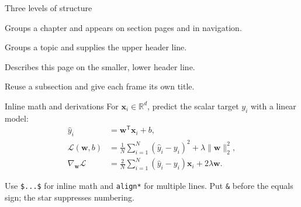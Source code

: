 


\begin{frame}{Three levels of structure}
  \begin{description}[Subsection]
    \item[Section] Groups a chapter and appears on section pages and in navigation.
    \item[Subsection] Groups a topic and supplies the upper header line.
    \item[Frametitle] Describes this page on the smaller, lower header line.
    \item[More pages] Reuse a subsection and give each frame its own title.
  \end{description}
\end{frame}

\begin{frame}{Inline math and derivations}
  For $\mathbf{x}_i\in\mathbb{R}^{d}$, predict the scalar target $y_i$ with a linear model:
  \begin{align*}
    \widehat{y}_i &= \mathbf{w}^{\mathsf T}\mathbf{x}_i+b, \\
    \mathcal{L}(\mathbf{w},b)
      &= \frac{1}{N}\sum_{i=1}^{N}(\widehat{y}_i-y_i)^2
         +\lambda\lVert\mathbf{w}\rVert_2^2, \\
    \nabla_{\mathbf{w}}\mathcal{L}
      &= \frac{2}{N}\sum_{i=1}^{N}(\widehat{y}_i-y_i)\mathbf{x}_i
         +2\lambda\mathbf{w}.
  \end{align*}
  \begin{notebox}[Typesetting]
    Use \texttt{\$...\$} for inline math and \texttt{align*} for multiple lines.
    Put \texttt{\&} before the equals sign; the star suppresses numbering.
  \end{notebox}
\end{frame}

